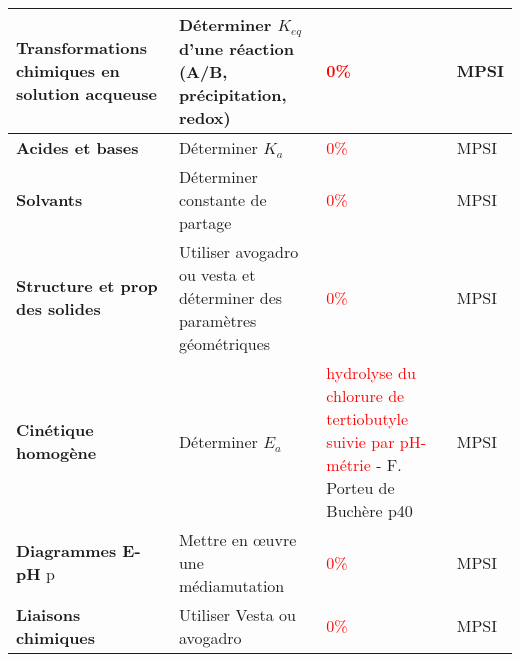 \newpage 
\begin{changemargin}{-1.5cm}{-0cm}
  \begin{tabularx}{\paperwidth-2cm}{| X | X | X | X |}
  \hline
  \textbf{Transformations chimiques en solution acqueuse} & Déterminer $K_{eq}$ d'une réaction (A/B, précipitation, redox) & \textcolor{red}{0\%} & MPSI \\
  \hline
  \textbf{Acides et bases} & Déterminer $K_a$ & \textcolor{red}{0\%} & MPSI \\
  \hline
  \textbf{Solvants} & Déterminer constante de partage & \textcolor{red}{0\%} & MPSI \\
  \hline
  \textbf{Structure et prop des solides} & Utiliser avogadro ou vesta et déterminer des paramètres géométriques & \textcolor{red}{0\%} & MPSI \\
  \hline
  \textbf{Cinétique homogène} & Déterminer $E_a$ & \textcolor{red}{hydrolyse du chlorure de tertiobutyle suivie par pH-métrie} - F. Porteu de Buchère p40& MPSI \\
  \hline
  \textbf{Diagrammes E-pH} p\pageref{LC_DiagrammeEpH} & Mettre en \oe uvre une médiamutation & \textcolor{red}{0\%} & MPSI \\
  \hline
  \textbf{Liaisons chimiques} & Utiliser Vesta ou avogadro & \textcolor{red}{0\%} & MPSI \\
  \hline
\end{tabularx}
\end{changemargin}

